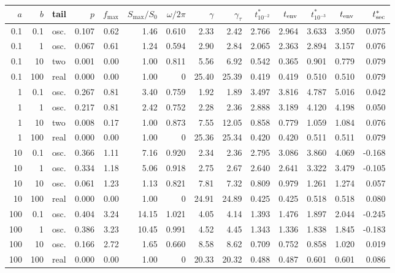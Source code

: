\begin{tabular}{rrlrrrrrrrrrrr}
\toprule
$a$ & $b$ & tail & $p$ & $f_{\max}$ & $S_{\max}/S_0$ & $\omega/2\pi$ & $\gamma$ & $\gamma_\tau$ & $t^*_{10^{-2}}$ & $t_{\rm env}$ & $t^*_{10^{-3}}$ & $t_{\rm env}$ & $t^*_{\rm sec}$ \\
\midrule
0.1 & 0.1 & osc. & 0.107 & 0.62 & 1.46 & 0.610 & 2.33 & 2.42 & 2.766 & 2.964 & 3.633 & 3.950 & 0.075 \\
0.1 & 1 & osc. & 0.067 & 0.61 & 1.24 & 0.594 & 2.90 & 2.84 & 2.065 & 2.363 & 2.894 & 3.157 & 0.076 \\
0.1 & 10 & two & 0.001 & 0.00 & 1.00 & 0.811 & 5.56 & 6.92 & 0.542 & 0.365 & 0.901 & 0.779 & 0.079 \\
0.1 & 100 & real & 0.000 & 0.00 & 1.00 & 0 & 25.40 & 25.39 & 0.419 & 0.419 & 0.510 & 0.510 & 0.079 \\
1 & 0.1 & osc. & 0.267 & 0.81 & 3.40 & 0.759 & 1.92 & 1.89 & 3.497 & 3.816 & 4.787 & 5.016 & 0.042 \\
1 & 1 & osc. & 0.217 & 0.81 & 2.42 & 0.752 & 2.28 & 2.36 & 2.888 & 3.189 & 4.120 & 4.198 & 0.050 \\
1 & 10 & two & 0.008 & 0.17 & 1.00 & 0.873 & 7.55 & 12.05 & 0.858 & 0.779 & 1.059 & 1.084 & 0.076 \\
1 & 100 & real & 0.000 & 0.00 & 1.00 & 0 & 25.36 & 25.34 & 0.420 & 0.420 & 0.511 & 0.511 & 0.079 \\
10 & 0.1 & osc. & 0.366 & 1.11 & 7.16 & 0.920 & 2.34 & 2.36 & 2.795 & 3.086 & 3.860 & 4.069 & -0.168 \\
10 & 1 & osc. & 0.334 & 1.18 & 5.06 & 0.918 & 2.75 & 2.67 & 2.640 & 2.641 & 3.322 & 3.479 & -0.105 \\
10 & 10 & osc. & 0.061 & 1.23 & 1.13 & 0.821 & 7.81 & 7.32 & 0.809 & 0.979 & 1.261 & 1.274 & 0.057 \\
10 & 100 & real & 0.000 & 0.00 & 1.00 & 0 & 24.91 & 24.89 & 0.425 & 0.425 & 0.518 & 0.518 & 0.080 \\
100 & 0.1 & osc. & 0.404 & 3.24 & 14.15 & 1.021 & 4.05 & 4.14 & 1.393 & 1.476 & 1.897 & 2.044 & -0.245 \\
100 & 1 & osc. & 0.386 & 3.23 & 10.45 & 0.991 & 4.52 & 4.45 & 1.343 & 1.336 & 1.838 & 1.845 & -0.183 \\
100 & 10 & osc. & 0.166 & 2.72 & 1.65 & 0.660 & 8.58 & 8.62 & 0.709 & 0.752 & 0.858 & 1.020 & 0.019 \\
100 & 100 & real & 0.000 & 0.00 & 1.00 & 0 & 20.33 & 20.32 & 0.488 & 0.487 & 0.601 & 0.601 & 0.086 \\
\bottomrule
\end{tabular}
